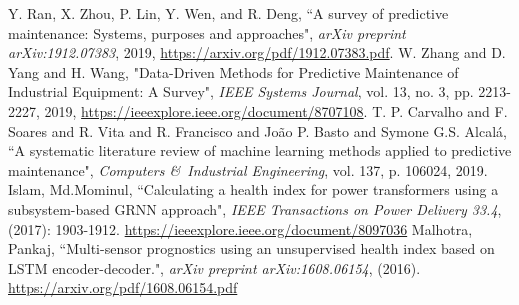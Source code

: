 \documentclass[11pt,a4paper]{article}
\begin{document}
\begin{section}
\begin{thebibliography}{9}
    {Y. Ran, X. Zhou, P. Lin, Y. Wen, and R. Deng},
    “A survey of predictive maintenance: Systems, purposes and approaches",
    \textit{arXiv preprint arXiv:1912.07383},
    2019,
    \href{https://arxiv.org/pdf/1912.07383.pdf}{https://arxiv.org/pdf/1912.07383.pdf}.
    {W. {Zhang} and D. {Yang} and H. {Wang}},
    "Data-Driven Methods for Predictive Maintenance of Industrial Equipment: A Survey",
    \textit{IEEE Systems Journal},
    vol. 13,
    no. 3,
    pp. 2213-2227,
    2019,
    \href{https://ieeexplore.ieee.org/document/8707108}{https://ieeexplore.ieee.org/document/8707108}.
    {T. P. Carvalho and F. Soares and R. Vita and R. Francisco and Jo{\~a}o P. Basto and Symone G.S. Alcal{\'a}},
    “A systematic literature review of machine learning methods applied to predictive maintenance",
    \textit{Computers \&\ Industrial Engineering},
    vol. 137,
    p. 106024,
    2019.
    {Islam, Md.Mominul}, 
    “Calculating a health index for power transformers using a subsystem-based GRNN approach",
    \textit{ IEEE Transactions on Power Delivery 33.4}, (2017): 1903-1912.
    \href{ https://ieeexplore.ieee.org/document/8097036}{ https://ieeexplore.ieee.org/document/8097036}
    {Malhotra, Pankaj}, 
    “Multi-sensor prognostics using an unsupervised health index based on LSTM encoder-decoder.",
    \textit{ arXiv preprint arXiv:1608.06154}, 
    (2016).
    \href{ https://arxiv.org/pdf/1608.06154.pdf}{ https://arxiv.org/pdf/1608.06154.pdf}
\end{thebibliography}
\end{section}
\end{document}
